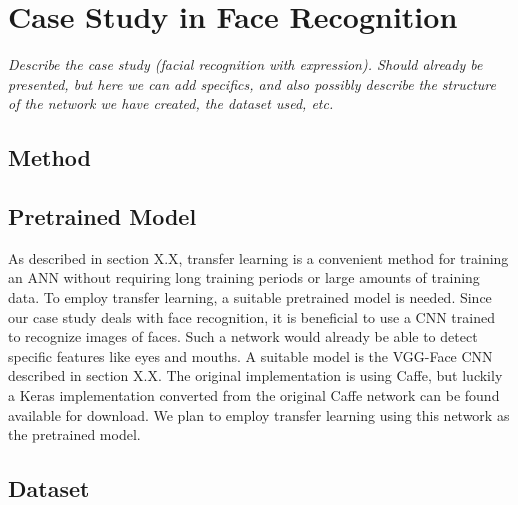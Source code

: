 

\section{Case Study in Face Recognition}

\textit{Describe the case study (facial recognition with expression).
Should already be presented, but here we can add specifics, and also possibly describe the structure of the network we have created, the dataset used, etc.}

\subsection{Method}



\subsection{Pretrained Model}


As described in section X.X, transfer learning is a convenient method for training an ANN without requiring long training periods or large amounts of training data. To employ transfer learning, a suitable pretrained model is needed. Since our case study deals with face recognition, it is beneficial to use a CNN trained to recognize images of faces. Such a network would already be able to detect specific features like eyes and mouths. A suitable model is the VGG-Face CNN described in section X.X. The original implementation is using Caffe, but luckily a Keras implementation converted from the original Caffe network can be found available for download. We plan to employ transfer learning using this network as the pretrained model.


\subsection{Dataset}

